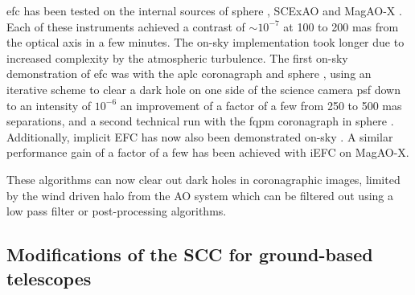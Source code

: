 \documentclass[letterpaper]{ar-1col}
\begin{document}
\ac{efc} has been tested on the internal sources of \ac{sphere} \citep{Potier20}, SCExAO \citep{ahn2023combining} and MagAO-X \citep{haffert2023implicit}.
%
Each of these instruments achieved a contrast of $\sim 10^{-7}$ at 100 to 200 mas from the optical axis in a few minutes.
%
The on-sky implementation took longer due to increased complexity by the atmospheric turbulence.
%
The first on-sky demonstration of \ac{efc} was with the \ac{aplc} coronagraph and \ac{sphere} \citep{Potier20,Potier22}, using an iterative scheme to clear a dark hole on one side of the science camera \ac{psf} down to an intensity of $10^{-6}$ an improvement of a factor of a few from 250 to 500 mas separations, and a second technical run with the \ac{fqpm} coronagraph in \ac{sphere} \citep{Galicher24}.
%
Additionally, implicit EFC \citep[iEFC; ][]{haffert2023implicit} has now also been demonstrated on-sky \citep{haffert2024sky, kueny2024magao}. %
A similar performance gain of a factor of a few has been achieved with iEFC on MagAO-X.

These algorithms can now clear out dark holes in coronagraphic images, limited by the wind driven halo from the AO system which can be filtered out using a low pass filter or post-processing algorithms.

\subsection{Modifications of the SCC for ground-based telescopes}
\end{document}
